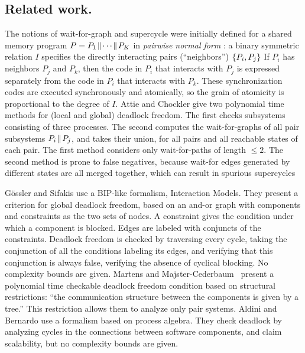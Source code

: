 
\subsection{Related work.} 
The notions of wait-for-graph and supercycle \cite{AC05,AE98}
were initially defined for a shared memory program
$P = P_1 \!\parallel\! \cdots \!\parallel\! P_K$ in \emph{pairwise normal form} \cite{Att16a,Att16b}: a binary
symmetric relation $I$ specifies the directly interacting pairs
(``neighbors'') $\{ P_i, P_j \}$ 
If $P_i$ has neighbors $P_j$ and $P_k$, then 
the code in $P_i$ that interacts with $P_j$ is expressed separately from
the code in $P_i$ that interacts with $P_k$. 
These synchronization codes are executed synchronously and
atomically, so the grain of atomicity is proportional to the
degree of $I$.
%
Attie and Chockler \cite{AC05} give two polynomial time 
methods for (local and global) deadlock freedom.
The first checks subsystems consisting of three
processes. The second computes the wait-for-graphs of all pair subsystems $P_i \!\parallel\! P_j$,
and takes their union, for all pairs
and all reachable states of each pair.
The first method considers only wait-for-paths of length $\le 2$. 
The second method is prone to false negatives,
because wait-for edges generated by different states are
all merged together, which can result in spurious supercycles


G{\"o}ssler and Sifakis \cite{GS03} use a BIP-like
formalism, Interaction Models. %
They present a criterion for global deadlock freedom, based on 
an and-or graph with components and constraints as the two sets of nodes. A
constraint gives the condition
under which a component is blocked. Edges are labeled with conjuncts
of the constraints.  Deadlock freedom is checked by traversing every
cycle, taking the conjunction of all the
conditions labeling its edges, and verifying that this conjunction is
always false, \ie verifying the absence of cyclical blocking.
No complexity bounds are given.
%
Martens and Majster-Cederbaum~\cite{MM12} present a polynomial time
checkable deadlock freedom condition based on structural restrictions:
``the communication structure between the components is given by a
tree.'' This restriction allows them to analyze only pair systems.
%
Aldini and Bernardo \cite{AB03} use a 
formalism based on process algebra. They check deadlock by analyzing cycles in
the connections between software components, and claim scalability, but no
complexity bounds are given.

